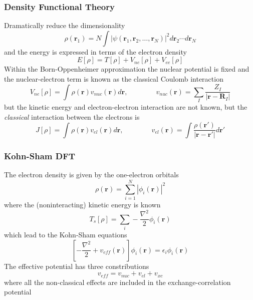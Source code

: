 \documentclass[mathserif]{beamer}
\begin{document}
\begin{frame}
    \frametitle{Density Functional Theory}
    Dramatically reduce the dimensionality 
    \begin{equation}
	\rho(\boldsymbol{r}_1) = N \int |\psi(\boldsymbol{r}_1, \boldsymbol{r}_2,\dots,
	\boldsymbol{r}_N)|^2 d\boldsymbol{r}_2\cdots d\boldsymbol{r}_N
    \end{equation}
    and the energy is expressed in terms of the electron density 
    \begin{equation}
	E[\rho] = T[\rho] + V_{ne}[\rho] + V_{ee}[\rho]
    \end{equation}
    Within the Born-Oppenheimer approximation the nuclear potential is fixed
    and the nuclear-electron term is known as the classical Coulomb interaction
    \begin{equation}
	V_{ne}[\rho] = \int \rho(\boldsymbol{r})v_{nuc}(\boldsymbol{r})d\boldsymbol{r}, 
	\qquad \qquad v_{nuc}(\boldsymbol{r}) = \sum_I \frac{Z_I}{|\boldsymbol{r}-\boldsymbol{R}_I|}
    \end{equation}
    but the kinetic energy and electron-electron interaction are not known, but
    the \emph{classical} interaction between the electrons is
    \begin{equation}
	J[\rho] = \int \rho(\boldsymbol{r})v_{el}(\boldsymbol{r})d\boldsymbol{r}, 
	\qquad \qquad v_{el}(\boldsymbol{r}) = 
	\int \frac{\rho(\boldsymbol{r}')}{|\boldsymbol{r}-\boldsymbol{r}'|} d\boldsymbol{r}'
    \end{equation}
\end{frame}

\begin{frame}
    \frametitle{Kohn-Sham DFT}
    The electron density is given by the one-electron orbitals
    \begin{equation}
	\rho(\boldsymbol{r}) = \sum_{i=1}^N |\phi_i(\boldsymbol{r})|^2
    \end{equation}
    where the (noninteracting) kinetic energy is known
    \begin{equation}
	T_s[\rho] = \sum_i -\frac{\nabla^2}{2}\phi_i(\boldsymbol{r})
    \end{equation}
    which lead to the Kohn-Sham equations
    \begin{equation}
	\left[-\frac{\nabla^2}{2} + v_{eff}(\boldsymbol{r})\right]\phi_i(\boldsymbol{r}) = 
	\epsilon_i\phi_i(\boldsymbol{r})
    \end{equation}
    The effective potential has three constributions
    \begin{equation}
	v_{eff} = v_{nuc} + v_{el} + v_{xc}
    \end{equation}
    where all the non-classical effects are included in the exchange-correlation potential
\end{frame}
\end{document}
